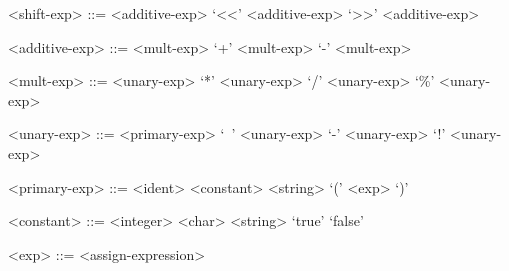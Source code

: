 \begin{grammar}
	<shift-exp> ::= <additive-exp>
	\alt <shift-exp> `<<' <additive-exp>
	\alt <shift-exp> `>>' <additive-exp>

	<additive-exp> ::= <mult-exp>
	\alt <additive-exp> `+' <mult-exp>
	\alt <additive-exp> `-' <mult-exp>

	<mult-exp> ::= <unary-exp> 
	\alt <mult-exp> `*' <unary-exp>
	\alt <mult-exp> `/' <unary-exp>
	\alt <mult-exp> `\%' <unary-exp>

	<unary-exp> ::= <primary-exp>
	\alt `~' <unary-exp>
	\alt `-' <unary-exp>
	\alt `!' <unary-exp>

	<primary-exp> ::= <ident>
	\alt <constant>
	\alt <string>
	\alt `(' <exp> `)'

	<constant> ::= <integer>
	\alt <char>
	\alt <string>
	\alt `true'
	\alt `false'

	<exp> ::= <assign-expression>

\end{grammar}




